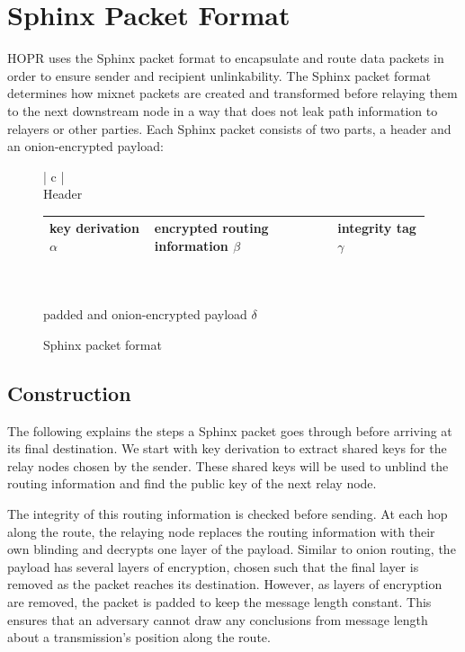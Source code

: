 \section{Sphinx Packet Format}
\label{sec:sphinx}

HOPR uses the Sphinx packet format \cite{sphinxpaper} to encapsulate and route data packets in order to ensure sender and recipient unlinkability. The Sphinx packet format determines how mixnet packets are created and transformed before relaying them to the next downstream node in a way that does not leak path information to relayers or other parties. Each Sphinx packet consists of two parts, a header and an onion-encrypted payload:

\begin{figure}[H]
    \centering
    \begin{tabular}{| c |}
        \hline
        \\[-0.8em]
        Header                                       \\[0.2em]
        \begin{tabular}{| m{} | m{} | m{} |}
            \hline
            key derivation $\alpha$ & encrypted routing information $\beta$ & integrity tag $\gamma$ \\
            \hline
        \end{tabular}                    \\[0.9em]
        \hline
        \hline
        \\[-0.7em]
        padded and onion-encrypted payload  $\delta$ \\[0.7em]
        \hline
    \end{tabular}
    \label{fig:Sphinx packet format}
    \caption{Sphinx packet format}
\end{figure}

\subsection{Construction}

The following explains the steps a Sphinx packet goes through before arriving at its final destination. We start with key derivation to extract shared keys for the relay nodes chosen by the sender. These shared keys will be used to unblind the routing information and find the public key of the next relay node.

The integrity of this routing information is checked before sending. At each hop along the route, the relaying node replaces the routing information with their own blinding and decrypts one layer of the payload. Similar to onion routing, the payload has several layers of encryption, chosen such that the final layer is removed as the packet reaches its destination. However, as layers of encryption are removed, the packet is padded to keep the message length constant. This ensures that an adversary cannot draw any conclusions from message length about a transmission's position along the route.

